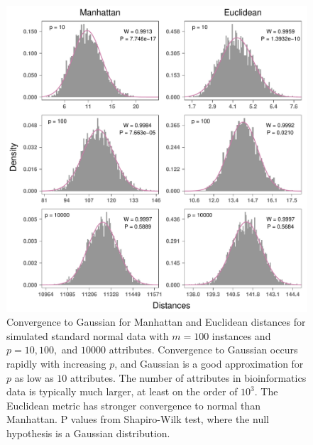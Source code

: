 \documentclass[10pt,letterpaper]{article}\usepackage[]{graphicx}\usepackage[]{color}
\begin{document}
\begin{figure}[H]
	\includegraphics[width=\textwidth]{central_limit_hist_normal_standard.pdf}
	\caption{Convergence to Gaussian for Manhattan and Euclidean distances for simulated standard normal data with $m=100$ instances and $p=10, 100,$ and $10000$ attributes. Convergence to Gaussian occurs rapidly with increasing $p$, and Gaussian is a good approximation for $p$ as low as $10$ attributes. The number of attributes in bioinformatics data is typically much larger, at least on the order of $10^3$. The Euclidean metric has stronger convergence to normal than Manhattan.  P values from Shapiro-Wilk test, where the null hypothesis is a Gaussian distribution.}
\end{figure}
\end{document}
